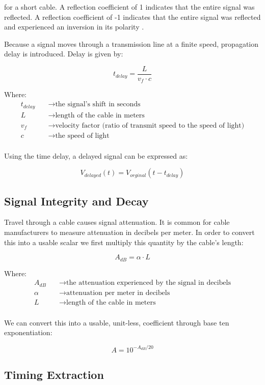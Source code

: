 \documentclass[10pt]{article}
\begin{document}
for a short cable. A reflection coefficient of 1 indicates that the entire signal was reflected. A reflection coefficient of -1 indicates that the entire signal was reflected and experienced an inversion in its polarity .

Because a signal moves through a transmission line at a finite speed, propagation delay is introduced. Delay is given by:

$$
t_{delay} = \frac{L}{v_f \cdot c}
$$

Where:
\begin{align*}
t_{delay} &\quad\to \text{the signal's shift in seconds} \\
L   &\quad\to \text{length of the cable in meters} \\
v_f    &\quad\to \text{velocity factor (ratio of transmit speed to the speed of light)} \\
c    &\quad\to \text{the speed of light} \\
\end{align*}

Using the time delay, a delayed signal can be expressed as:

$$
V_{delayed}(t) = V_{orginal}(t - t_{delay})
$$

\subsection{Signal Integrity and Decay}

Travel through a cable causes signal attenuation. It is common for cable manufacturers to measure attenuation in decibels per meter. In order to convert this into a usable scalar we first multiply this quantity by the cable's length:

$$
A_{dB} = \alpha \cdot L
$$

Where:
\begin{align*}
A_{dB} &\quad\to \text{the attenuation experienced by the signal in decibels} \\
\alpha   &\quad\to \text{attenuation per meter in decibels} \\
L   &\quad\to \text{length of the cable in meters} \\
\end{align*}

We can convert this into a usable, unit-less, coefficient through base ten exponentiation: 

$$
A = 10^{-A_{dB}/20}
$$


\subsection{Timing Extraction}
\end{document}
